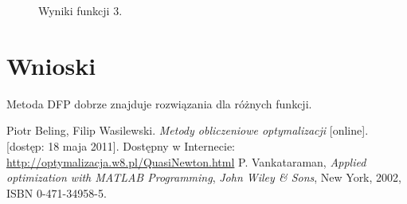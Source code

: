 \documentclass{classrep}
\begin{document}
\begin{figure}
\noindent{}
\caption{Wyniki funkcji 3.}
\end{figure}

\section{Wnioski}
Metoda DFP dobrze znajduje rozwiązania dla różnych funkcji.

\begin{thebibliography}{99}
Piotr Beling, Filip Wasilewski. \textit{Metody obliczeniowe optymalizacji} [online]. [dostęp: 18 maja 2011]. Dostępny w Internecie: \url{http://optymalizacja.w8.pl/QuasiNewton.html}
P. Vankataraman, \textit{Applied optimization with MATLAB Programming}, \textit{John Wiley \& Sons}, New York, 2002, ISBN 0-471-34958-5.
\end{thebibliography}
\end{document}

